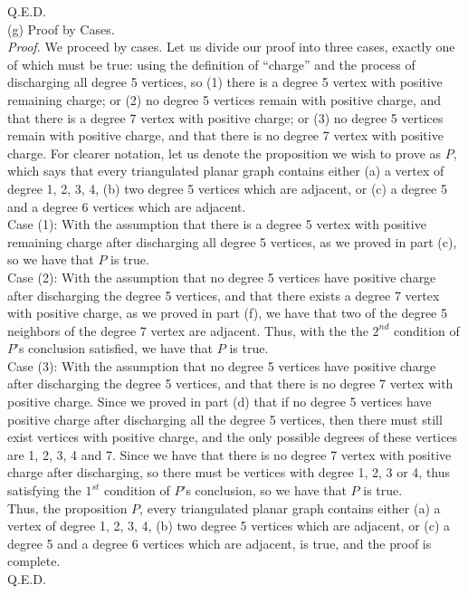 \documentclass{article}
\begin{document}
\indent Q.E.D.\\[.5cm]
(g) Proof by Cases.\\[.3cm]
\indent\textit{Proof.} We proceed by cases. Let us divide our proof into three cases, exactly one of which must be true: using the definition of ``charge'' and the process of discharging all degree 5 vertices, so (1) there is a degree 5 vertex with positive remaining charge; or (2) no degree 5 vertices remain with positive charge, and that there is a degree 7 vertex with positive charge; or (3) no degree 5 vertices remain with positive charge, and that there is no degree 7 vertex with positive charge. For clearer notation, let us denote the proposition we wish to prove as $P,$ which says that every triangulated planar graph contains either (a) a vertex of degree 1, 2, 3, 4, (b) two degree 5 vertices which are adjacent, or (c) a degree 5 and a degree 6 vertices which are adjacent. \\[.2cm]
\indent Case (1): With the assumption that there is a degree 5 vertex with positive remaining charge after discharging all degree 5 vertices, as we proved in part (c), so we have that $P$ is true. \\[.1cm]
\indent Case (2): With the assumption that no degree 5 vertices have positive charge after discharging the degree 5 vertices, and that there exists a degree 7 vertex with positive charge, as we proved in part (f), we have that two of the degree 5 neighbors of the degree 7 vertex are adjacent. Thus, with the the $2^{nd}$ condition of $P$'s conclusion satisfied, we have that $P$ is true. \\[.1cm]
\indent Case (3): With the assumption that no degree 5 vertices have positive charge after discharging the degree 5 vertices, and that there is no degree 7 vertex with positive charge. Since we proved in part (d) that if no degree 5 vertices have positive charge after discharging all the degree 5 vertices, then there must still exist vertices with positive charge, and the only possible degrees of these vertices are 1, 2, 3, 4 and 7. Since we have that there is no degree 7 vertex with positive charge after discharging, so there must be vertices with degree 1, 2, 3 or 4, thus satisfying the $1^{st}$ condition of $P$'s conclusion, so we have that $P$ is true. \\[.2cm]
\indent Thus, the proposition $P$, every triangulated planar graph contains either (a) a vertex of degree 1, 2, 3, 4, (b) two degree 5 vertices which are adjacent, or (c) a degree 5 and a degree 6 vertices which are adjacent, is true, and the proof is complete.\\[.1cm]
\indent Q.E.D.
\end{document}
